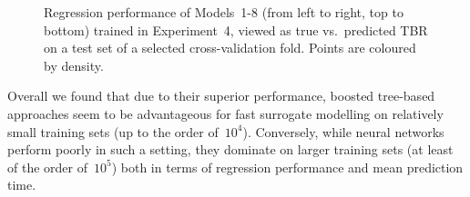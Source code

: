 \begin{figure}
	\centering
	\begin{minipage}{0.5\linewidth}
		\centering
	\end{minipage}\hfill%
	\begin{minipage}{0.5\linewidth}
		\centering
	\end{minipage}

	\begin{minipage}{0.5\linewidth}
		\centering
	\end{minipage}\hfill%
	\begin{minipage}{0.5\linewidth}
		\centering
	\end{minipage}

	\begin{minipage}{0.5\linewidth}
		\centering
	\end{minipage}\hfill%
	\begin{minipage}{0.5\linewidth}
		\centering
	\end{minipage}

	\begin{minipage}{0.5\linewidth}
		\centering
	\end{minipage}\hfill%
	\begin{minipage}{0.5\linewidth}
		\centering
	\end{minipage}

	\caption{Regression performance of Models~1-8 (from left to right, top to
		bottom) trained in Experiment~4, viewed
		as true vs.~predicted TBR on a test set of a selected cross-validation
		fold. Points are coloured by density.}
	\label{fig:reg-performance}
\end{figure}

Overall we found that due to their superior performance, boosted tree-based
approaches seem to be advantageous for fast surrogate modelling on relatively small training
sets (up to the order of~$10^4$). Conversely, while neural networks perform
poorly in such a setting, they dominate on larger training sets (at least of the
order of~$10^5$) both in terms of regression performance and mean prediction time.

